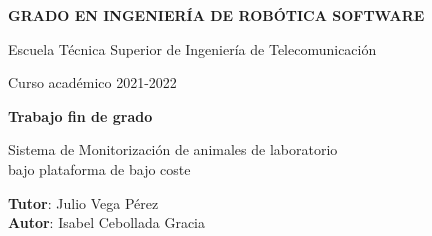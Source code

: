 \thispagestyle{empty}
\vspace{2cm}

\begin{figure}[htb]
  \centerline{}
\end{figure}

\begin{center}
  {\Large {\bf GRADO EN INGENIERÍA DE ROBÓTICA SOFTWARE}}
  \vspace{5mm}
 
  {\large {Escuela Técnica Superior de Ingeniería de Telecomunicación}}
  \vspace{5mm}

  {\large {Curso académico 2021-2022}}

  \vspace{1cm}

  {\large {\bf Trabajo fin de grado}}

  \vspace{2cm}

  {\Large {Sistema de Monitorización de animales de laboratorio\\
               bajo plataforma de bajo coste\\[1cm] }}

  \vspace{5cm}
  {\bf Tutor}: Julio Vega Pérez \\
  {\bf Autor}: Isabel Cebollada Gracia
\end{center}

\clearpage
\thispagestyle{empty}
